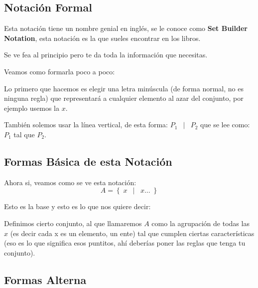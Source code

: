 \documentclass[12pt, fleqn]{report}                             %
\DeclareMathOperator \Space     {\quad}                         %
\DeclareMathOperator \MiniSpace {\;}                            %
\newcommand \Such           {\MiniSpace | \MiniSpace}           %
\theoremstyle{break}                                            %
\newcommand{\Set}[1]            {\left\{ \; #1 \; \right\}}     %
\begin{document}
            \clearpage
            \subsection{Notación Formal} 

                Esta notación tiene un nombre genial en inglés, se le conoce como
                \textbf{Set Builder Notation}, esta notación es la que sueles encontrar en los libros. 

                Se ve fea al principio pero te da toda la información que necesitas.

                Veamos como formarla poco a poco:

                Lo primero que hacemos es elegir una letra minúscula (de forma normal, no es ninguna regla)
                que representará a cualquier elemento al azar del conjunto, por ejemplo usemos la $x$.

                También solemos usar la línea vertical, de esta forma: $P_1 \Such P_2$ que se lee como: 
                $P_1$ tal que $P_2$.  


                \subsection*{Formas Básica de esta Notación}

                    Ahora si, veamos como se ve esta notación:
                    \begin{equation*}   
                        A = \Set{ x \Such x \dots }
                    \end{equation*}

                    Esto es la base y esto es lo que nos quiere decir:

                    Definimos cierto conjunto, al que llamaremos $A$ como la agrupación de todas las $x$
                    (es decir cada x es un elemento, un ente) tal que cumplen ciertas características
                    (eso es lo que significa esos puntitos, ahí deberías poner las reglas que tenga
                    tu conjunto).

                \subsection{Formas Alterna}
                
\end{document}
